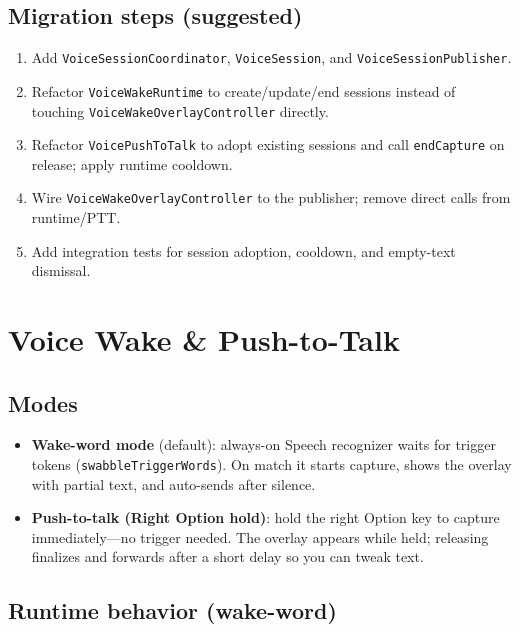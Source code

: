 \subsection{Migration steps (suggested)}


\begin{enumerate}
  \item Add \texttt{VoiceSessionCoordinator}, \texttt{VoiceSession}, and \texttt{VoiceSessionPublisher}.
  \item Refactor \texttt{VoiceWakeRuntime} to create/update/end sessions instead of touching \texttt{VoiceWakeOverlayController} directly.
  \item Refactor \texttt{VoicePushToTalk} to adopt existing sessions and call \texttt{endCapture} on release; apply runtime cooldown.
  \item Wire \texttt{VoiceWakeOverlayController} to the publisher; remove direct calls from runtime/PTT.
  \item Add integration tests for session adoption, cooldown, and empty-text dismissal.
\end{enumerate}



\clearpage

\section{Voice Wake \& Push-to-Talk}


\subsection{Modes}


\begin{itemize}
  \item \textbf{Wake-word mode} (default): always-on Speech recognizer waits for trigger tokens (\texttt{swabbleTriggerWords}). On match it starts capture, shows the overlay with partial text, and auto-sends after silence.
  \item \textbf{Push-to-talk (Right Option hold)}: hold the right Option key to capture immediately—no trigger needed. The overlay appears while held; releasing finalizes and forwards after a short delay so you can tweak text.
\end{itemize}


\subsection{Runtime behavior (wake-word)}


